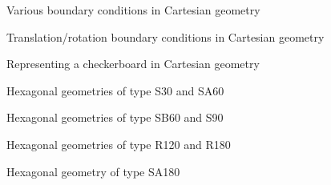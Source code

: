 \begin{figure}[!]  
\begin{center} 
\epsfxsize=15cm
\centerline{ }
\parbox{14cm}{\caption{Various boundary conditions in Cartesian geometry}\label{fig:cartebcr}}   
\end{center}  
\end{figure}

\begin{figure}[!]  
\begin{center} 
\epsfxsize=10cm
\centerline{ }
\parbox{14cm}{\caption{Translation/rotation boundary conditions in Cartesian geometry}\label{fig:cartebct}}   
\end{center}  
\end{figure}

\begin{figure}[!]  
\begin{center} 
\epsfxsize=13cm
\centerline{ }
\parbox{14cm}{\caption{Representing a checkerboard in Cartesian geometry}\label{fig:cartebcdam}}   
\end{center}  
\end{figure}

\begin{figure}[!]  
\begin{center}
\epsfxsize=15cm
\centerline{ }
\parbox{14cm}{\caption{Hexagonal geometries of type S30 and SA60}\label{fig:s30}}   
\end{center}  
\end{figure}

\begin{figure}[!]  
\begin{center} 
\epsfxsize=15cm
\centerline{ }
\parbox{14cm}{\caption{Hexagonal geometries of type SB60 and S90}\label{fig:sb60}}   
\end{center}  
\end{figure}

\begin{figure}[!]  
\begin{center} 
\epsfxsize=12cm
\centerline{ }
\parbox{14cm}{\caption{Hexagonal geometries of type R120 and R180}\label{fig:r120}}   
\end{center}  
\end{figure}

\begin{figure}[!]  
\begin{center} 
\epsfxsize=5cm
\centerline{ }
\parbox{14cm}{\caption{Hexagonal geometry of type SA180}\label{fig:sa180}}   
\end{center}  
\end{figure}

